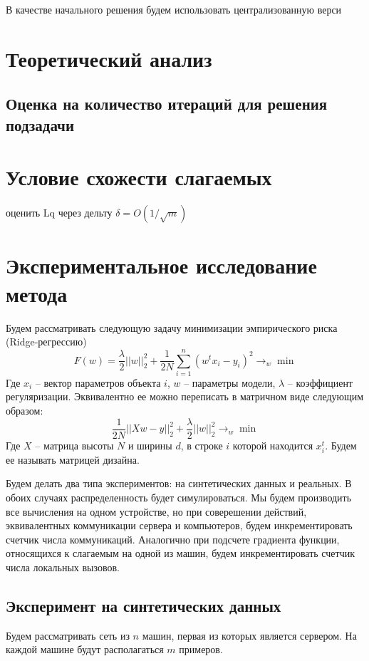 \documentclass[a4paper,12pt]{extarticle}
\begin{document}
    В качестве начального решения будем использовать централизованную верси
\section{Теоретический анализ}
    \subsection{Оценка на количество итераций для решения подзадачи}

\section{Условие схожести слагаемых }
    оценить Lq через дельту
    $\delta = O (1/\sqrt{m})$

\section{Экспериментальное исследование метода}
    Будем рассматривать следующую задачу минимизации эмпирического риска (Ridge-регрессию)
    \[ F(w) = \frac{\lambda}{2} ||w||_2^2 + \frac{1}{2N} \sum_{i=1}^n (w^t x_i - y_i)^2 \to_{w} \min \]
     Где $x_i$ -- вектор параметров объекта $i$, $w$ -- параметры модели, $ \lambda $ -- коэффициент регуляризации.
    Эквивалентно ее можно переписать в матричном виде следующим образом: 
        \[\frac{1}{2N}||Xw - y||_2^2 + \frac{\lambda}{2} ||w||_2^2 \to_{w} \min \]
    Где $X$ -- матрица высоты $N$ и ширины $d$, в строке $i$ которой находится $x_i^t$.
    Будем ее называть матрицей дизайна. 
   
    Будем делать два типа экспериментов: на синтетических данных и реальных.
    В обоих случаях распределенность будет симулироваться.
    Мы будем производить все вычисления на одном устройстве, но при соверешении действий,
    эквивалентных коммуникации сервера и компьютеров, будем инкрементировать счетчик числа коммуникаций.
    Аналогично при подсчете градиента функции, относящихся к слагаемым на одной из машин,
    будем инкрементировать счетчик числа локальных вызовов. 

    \subsection{Эксперимент на синтетических данных}
    Будем рассматривать сеть из $n$ машин, первая из которых является сервером.
    На каждой машине будут располагаться $m$ примеров.
        
\end{document}
